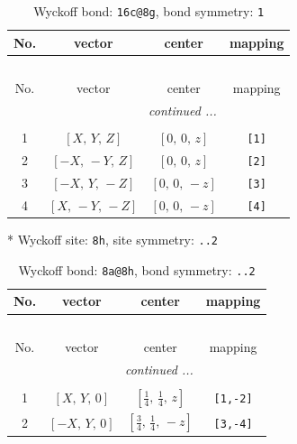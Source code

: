 \documentclass[fleqn,8pt]{jsarticle}
\begin{document}
\begin{longtable}{cccc}
\caption{Wyckoff bond: {\tt 16c@8g}, bond symmetry: {\tt 1}}
 \\
 \hline \hline
No. & vector & center & mapping \\ \hline \endfirsthead

\multicolumn{3}{l}{\tablename\ \thetable{}} \\
 \hline \hline
No. & vector & center & mapping \\ \hline \endhead

 \hline \hline
\multicolumn{3}{r}{\footnotesize\it continued ...} \\ \endfoot

 \hline \hline
\multicolumn{3}{r}{} \\ \endlastfoot

1 & $\left[ X,\, Y,\, Z \right]$ & $\left[ 0,\, 0,\, z \right]$ & {\tt [1]} \\ \hline
2 & $\left[ - X,\, - Y,\, Z \right]$ & $\left[ 0,\, 0,\, z \right]$ & {\tt [2]} \\ \hline
3 & $\left[ - X,\, Y,\, - Z \right]$ & $\left[ 0,\, 0,\, - z \right]$ & {\tt [3]} \\ \hline
4 & $\left[ X,\, - Y,\, - Z \right]$ & $\left[ 0,\, 0,\, - z \right]$ & {\tt [4]} \\
\end{longtable}
* Wyckoff site: {\tt 8h}, site symmetry: {\tt ..2}
\renewcommand{\arraystretch}{1.2}
\begin{longtable}{cccc}
\caption{Wyckoff bond: {\tt 8a@8h}, bond symmetry: {\tt ..2}}
 \\
 \hline \hline
No. & vector & center & mapping \\ \hline \endfirsthead

\multicolumn{3}{l}{\tablename\ \thetable{}} \\
 \hline \hline
No. & vector & center & mapping \\ \hline \endhead

 \hline \hline
\multicolumn{3}{r}{\footnotesize\it continued ...} \\ \endfoot

 \hline \hline
\multicolumn{3}{r}{} \\ \endlastfoot

1 & $\left[ X,\, Y,\, 0 \right]$ & $\left[ \frac{1}{4},\, \frac{1}{4},\, z \right]$ & {\tt [1,-2]} \\ \hline
2 & $\left[ - X,\, Y,\, 0 \right]$ & $\left[ \frac{3}{4},\, \frac{1}{4},\, - z \right]$ & {\tt [3,-4]} \\
\end{longtable}
\end{document}
